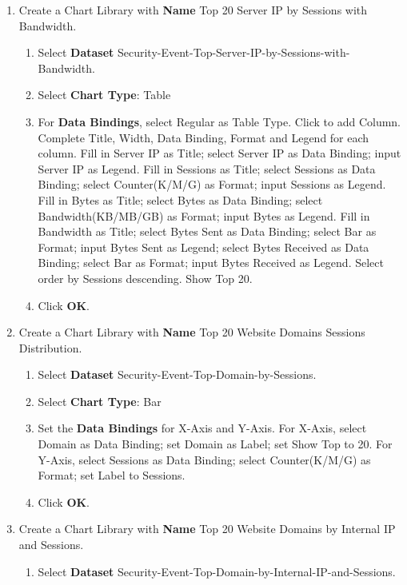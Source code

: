 \begin{description}
\begin{enumerate}
\begin{enumerate}
            \item	Click \textbf{OK}.
        \end{enumerate}
        \item Create a Chart Library with \textbf{Name} Top 20 Server IP by Sessions with Bandwidth.
        \begin{enumerate}
            \item	Select \textbf{Dataset} Security-Event-Top-Server-IP-by-Sessions-with-Bandwidth.
            \item	Select \textbf{Chart Type}: Table
            \item	For \textbf{Data Bindings}, select Regular as Table Type. Click to add Column. Complete Title, Width, Data Binding, Format and Legend for each column. Fill in Server IP as Title; select Server IP as Data Binding; input Server IP as Legend. Fill in Sessions as Title; select Sessions as Data Binding; select Counter(K/M/G) as Format; input Sessions as Legend. Fill in Bytes as Title; select Bytes as Data Binding; select Bandwidth(KB/MB/GB) as Format; input Bytes as Legend. Fill in Bandwidth as Title; select Bytes Sent as Data Binding; select Bar as Format; input Bytes Sent as Legend; select Bytes Received as Data Binding; select Bar as Format; input Bytes Received as Legend. Select order by Sessions descending. Show Top 20.
            \item	Click \textbf{OK}.
        \end{enumerate}
        \item Create a Chart Library with \textbf{Name} Top 20 Website Domains Sessions Distribution.
        \begin{enumerate}
            \item	Select \textbf{Dataset} Security-Event-Top-Domain-by-Sessions.
            \item	Select \textbf{Chart Type}: Bar
            \item	Set the \textbf{Data Bindings} for X-Axis and Y-Axis. For X-Axis, select Domain as Data Binding; set Domain as Label; set Show Top to 20. For Y-Axis, select Sessions as Data Binding; select Counter(K/M/G) as Format; set Label to Sessions.
            \item	Click \textbf{OK}.
        \end{enumerate}
        \item Create a Chart Library with \textbf{Name} Top 20 Website Domains by Internal IP and Sessions.
        \begin{enumerate}
            \item	Select \textbf{Dataset} Security-Event-Top-Domain-by-Internal-IP-and-Sessions.

\end{enumerate}
\end{enumerate}
\end{description}
